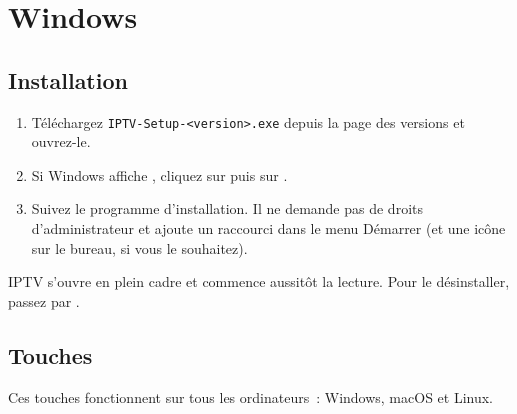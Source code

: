 \begin{center}
  \download
\end{center}


\section{Windows}
\label{sec:windows}

\subsection{Installation}
\begin{enumerate}
  \item Téléchargez \texttt{IPTV-Setup-\textless version\textgreater.exe}
        depuis la page des versions et ouvrez-le.
  \item Si Windows affiche ,
        cliquez sur  puis sur
        .
  \item Suivez le programme d'installation. Il ne demande pas de droits
        d'administrateur et ajoute un raccourci dans le menu Démarrer (et une
        icône sur le bureau, si vous le souhaitez).
\end{enumerate}
IPTV s'ouvre en plein cadre et commence aussitôt la lecture. Pour le
désinstaller, passez par .

\subsection{Touches}
\label{sec:keys}
Ces touches fonctionnent sur tous les ordinateurs~: Windows, macOS et Linux.

